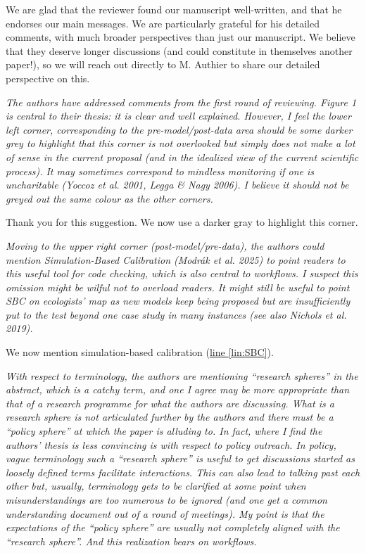 \documentclass[11pt,letter]{article}
\begin{document}
We are glad that the reviewer found our manuscript well-written, and that he endorses our main messages. We are particularly grateful for his detailed comments, with much broader perspectives than just our manuscript. We believe that they deserve longer discussions (and could constitute in themselves another paper!), so we will reach out directly to M. Authier to share our detailed perspective on this.

\begin{mybox}
\emph{The authors have addressed comments from the first round of reviewing. Figure 1 is central to their thesis: it is clear and well explained. However, I feel the lower left corner, corresponding to the pre-model/post-data area should be some darker grey to highlight that this corner is not overlooked but simply does not make a lot of sense in the current proposal (and in the idealized view of the current scientific process). It may sometimes correspond to mindless monitoring if one is uncharitable (Yoccoz et al. 2001, Legga \& Nagy 2006). I believe it should not be greyed out the same colour as the other corners.}  
\end{mybox}

Thank you for this suggestion. We now use a darker gray to highlight this corner.

\begin{mybox}
\emph{Moving to the upper right corner (post-model/pre-data), the authors could mention
Simulation-Based Calibration (Modrák et al. 2025) to point readers to this useful tool for code
checking, which is also central to workflows. I suspect this omission might be wilful not to
overload readers. It might still be useful to point SBC on ecologists’ map as new models keep
being proposed but are insufficiently put to the test beyond one case study in many instances
(see also Nichols et al. 2019).}  
\end{mybox}

We now mention simulation-based calibration (\href{file:forecastflows_r2\#lintarget:SBC}{line \ref*{lin:SBC}}).

\begin{mybox}
\emph{With respect to terminology, the authors are mentioning “research spheres” in the abstract,
which is a catchy term, and one I agree may be more appropriate than that of a research
programme for what the authors are discussing. What is a research sphere is not articulated
further by the authors and there must be a “policy sphere” at which the paper is alluding to. In
fact, where I find the authors’ thesis is less convincing is with respect to policy outreach. In
policy, vague terminology such a “research sphere” is useful to get discussions started as
loosely defined terms facilitate interactions. This can also lead to talking past each other but,
usually, terminology gets to be clarified at some point when misunderstandings are too
numerous to be ignored (and one get a common understanding document out of a round of
meetings). My point is that the expectations of the “policy sphere” are usually not completely
aligned with the “research sphere”. And this realization bears on workflows.}  
\end{mybox}
\end{document}
